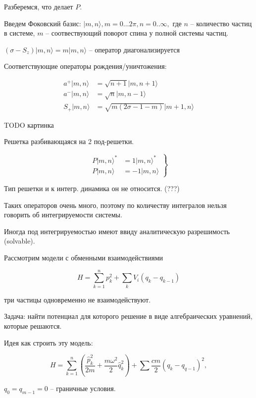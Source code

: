 Разберемся, что делает $P$.

Введем Фоковский базис: $|m,n\rangle, m=0\ldots2\pi, n= 0..\infty,$ где
$n$ -- количество частиц в системе, $m$ -- соотвествующий поворот спина у полной системы
частиц.

$(\sigma - S_z) | m,n \rangle = m | m,n\rangle$ -- оператор диагонализируется

Соответствующие операторы рождения/уничтожения:

\begin{equation}
    \begin{align}
        a^+|m,n\rangle & = \sqrt{n+1} | m, n+1\rangle\\
        a^-|m,n\rangle & = \sqrt{n}   | m, n-1\rangle \\
        S_+|m,n\rangle & = \sqrt{m (2\sigma -1 -m)} | m+1, n\rangle
    \end{align}
\end{equation}

TODO картинка

Решетка разбивающаяся на 2 под-решетки.

\begin{equation}
    \left.\begin{align}
        P | m,n\rangle^* & = 1 |m,n\rangle^* \\
        P | m,n\rangle & = -1 | m,n\rangle
  \end{align}\right\}
\end{equation}

Тип решетки и к интегр. динамика он не относится. (???)

Таких операторов очень много, поэтому по количеству интегралов нельзя говорить об интегрируемости
системы.

Иногда под интегрируемостью имеют ввиду аналитическую разрешимость (solvable).

Рассмотрим модели с обменными взаимодействиями

$$H = \sum_{k=1}^n p_k^2 + \sum_k V_i (q_k - q_{k-1})$$

три частицы одновременно не взаимодействуют.

Задача: найти потенциал для которого решение в виде алгебраических уравнений, которые решаются.


Идея как строить эту модель:

$$ H = \sum_{k=1}^n \left(\frac{\hat p_k^2}{2m} + \frac{m\omega^2}{2}\hat q^2_k\right)
     + \sum \frac{cm}{2} (q_k-q_{q-1})^2,$$

     $q_0=q_{m-1}=0$ -- граничные условия.

